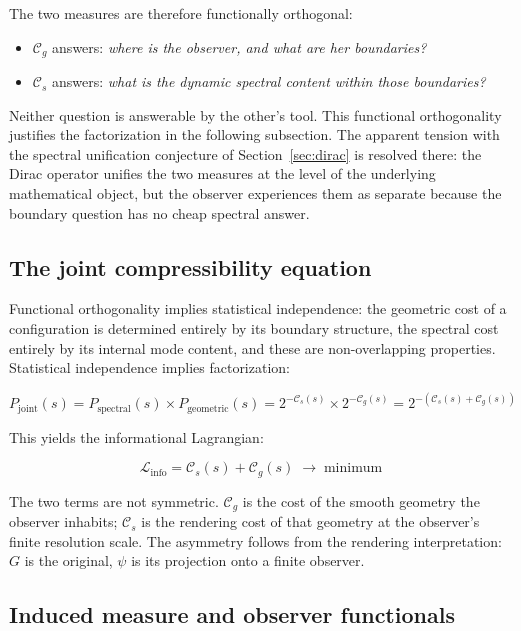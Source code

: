 \documentclass[12pt,a4paper]{article}
\newcommand{\Linfo}{\mathcal{L}_{\mathrm{info}}}
\newcommand{\Cs}{\mathcal{C}_s}
\newcommand{\Cg}{\mathcal{C}_g}
\newcommand{\Pjoint}{P_{\mathrm{joint}}}
\begin{document}
The two measures are therefore functionally orthogonal:

\begin{itemize}
  \item $\Cg$ answers: \emph{where is the observer, and what are her boundaries?}
  \item $\Cs$ answers: \emph{what is the dynamic spectral content within those boundaries?}
\end{itemize}

Neither question is answerable by the other's tool. This functional orthogonality justifies the factorization in the following subsection. The apparent tension with the spectral unification conjecture of Section~\ref{sec:dirac} is resolved there: the Dirac operator unifies the two measures at the level of the underlying mathematical object, but the observer experiences them as separate because the boundary question has no cheap spectral answer.


\subsection*{The joint compressibility equation}

Functional orthogonality implies statistical independence: the geometric cost of a configuration is determined entirely by its boundary structure, the spectral cost entirely by its internal mode content, and these are non-overlapping properties. Statistical independence implies factorization:

\begin{equation}
\boxed{
\Pjoint(s)
= P_{\mathrm{spectral}}(s) \times P_{\mathrm{geometric}}(s)
= 2^{-\Cs(s)} \times 2^{-\Cg(s)}
= 2^{-(\Cs(s) + \Cg(s))}
}
\end{equation}

This yields the informational Lagrangian:

\begin{equation}
\label{eq:lagrangian}
\Linfo = \Cs(s) + \Cg(s) \;\longrightarrow\; \text{minimum}
\end{equation}

The two terms are not symmetric. $\Cg$ is the cost of the smooth geometry the observer inhabits; $\Cs$ is the rendering cost of that geometry at the observer's finite resolution scale. The asymmetry follows from the rendering interpretation: $G$ is the original, $\psi$ is its projection onto a finite observer.


\subsection*{Induced measure and observer functionals}
\end{document}
